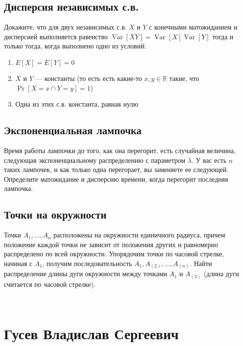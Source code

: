 \documentclass[12pt]{article}
\newcommand\R{\mathbb{R}}
\DeclareMathOperator{\Var}{Var}
\begin{document}
\subsection{Дисперсия независимых с.в.}
Докажите, что для двух независимых с.в. $X$ и $Y$ с конечными матожиданием и дисперсией выполняется равенство $\Var[XY] = \Var[X]\Var[Y]$ тогда и только тогда, когда выполнено одно из условий:
\begin{enumerate}
    \item $E[X] = E[Y] = 0$
    \item $X$ и $Y$ --- константы (то есть есть какие-то $x, y \in \R$ такие, что $\Pr[X = x \cap Y = y] = 1$)
    \item Одна из этих с.в. константа, равная нулю
\end{enumerate}

\subsection{Экспоненциальная лампочка}
Время работы лампочки до того, как она перегорит, есть случайная величина, следующая экспоненциальному распределению с параметром $\lambda$. У вас есть $n$ таких лампочек, и как только одна перегорает, вы заменяете ее следующей. Определите матожидание и дисперсию времени, когда перегорит последняя лампочка.

\subsection{Точки на окружности}
Точки $A_1, \dots, A_n$ расположены на окружности единичного радиуса, причем положение каждой точки не зависит от положения других и равномерно распределено по всей окружности. Упорядочим точки по часовой стрелке, начиная с $A_1$, получим последовательность $A_1, A_{(2)}, \dots, A_{(n)}$. Найти распределение длины дуги окружности между точками $A_1$ и $A_{(2)}$ (длина дуги считается по часовой стрелке).

\newpage
~
\newpage
\section{Гусев Владислав Сергеевич}
\end{document}
